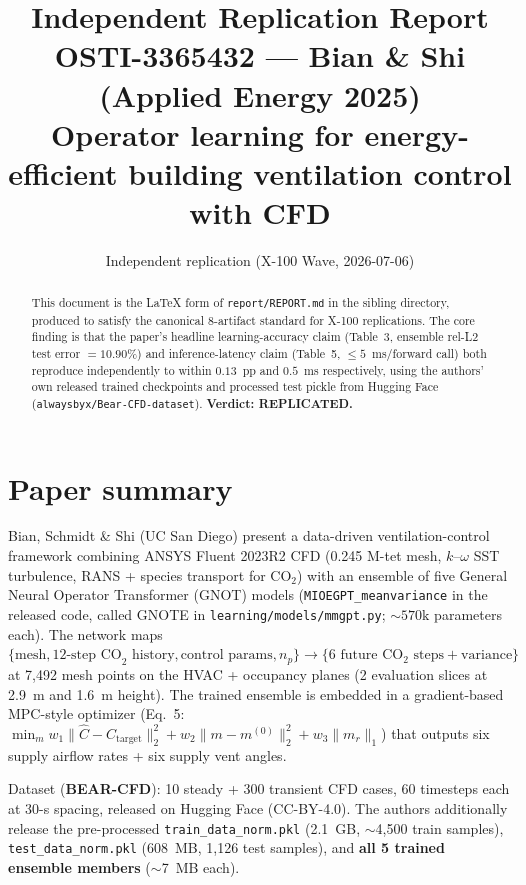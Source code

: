 \documentclass[10pt]{article}
\title{Independent Replication Report \\
{\large OSTI-3365432 — Bian \& Shi (Applied Energy 2025)}\\
{\normalsize Operator learning for energy-efficient building ventilation control with CFD}}
\author{Independent replication (X-100 Wave, 2026-07-06)}
\date{}
\begin{document}
\maketitle

\begin{abstract}
This document is the LaTeX form of \texttt{report/REPORT.md} in the sibling
directory, produced to satisfy the canonical 8-artifact standard for X-100
replications. The core finding is that the paper's headline learning-accuracy
claim (Table~3, ensemble rel-L2 test error $=10.90\%$) and inference-latency
claim (Table~5, $\leq 5$~ms/forward call) both reproduce independently to
within $0.13$~pp and $0.5$~ms respectively, using the authors' own released
trained checkpoints and processed test pickle from Hugging Face
(\texttt{alwaysbyx/Bear-CFD-dataset}). \textbf{Verdict: REPLICATED.}
\end{abstract}

\section{Paper summary}
Bian, Schmidt \& Shi (UC San Diego) present a data-driven ventilation-control
framework combining ANSYS Fluent 2023R2 CFD (0.245 M-tet mesh, $k$--$\omega$
SST turbulence, RANS + species transport for CO$_2$) with an ensemble of five
General Neural Operator Transformer (GNOT) models
(\texttt{MIOEGPT\_meanvariance} in the released code, called GNOTE in
\texttt{learning/models/mmgpt.py}; $\sim 570\text{k}$ parameters each). The
network maps $\{\text{mesh}, \text{12-step CO}_2 \text{ history},
\text{control params}, n_p\} \to \{\text{6 future CO}_2 \text{ steps} +
\text{variance}\}$ at 7{,}492 mesh points on the HVAC + occupancy planes
(2 evaluation slices at 2.9~m and 1.6~m height). The trained ensemble is
embedded in a gradient-based MPC-style optimizer (Eq.~5:
$\min_m w_1 \|\hat{C}-C_{\text{target}}\|_2^2 + w_2 \|m-m^{(0)}\|_2^2 +
w_3 \|m_r\|_1$) that outputs six supply airflow rates + six supply vent angles.

Dataset (\textbf{BEAR-CFD}): 10 steady + 300 transient CFD cases, 60 timesteps
each at 30-s spacing, released on Hugging Face (CC-BY-4.0). The authors
additionally release the pre-processed \texttt{train\_data\_norm.pkl}
(2.1~GB, $\sim$4{,}500 train samples), \texttt{test\_data\_norm.pkl} (608~MB,
1{,}126 test samples), and \textbf{all 5 trained ensemble members}
($\sim$7~MB each).
\end{document}

